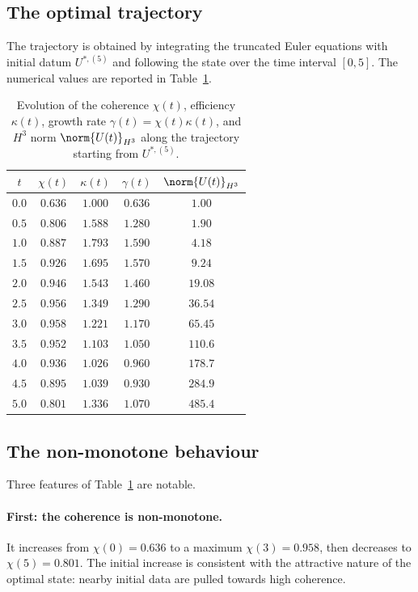 \subsection{The optimal trajectory}
\label{part-5:ssec:optimal-trajectory}

The trajectory is obtained by integrating the truncated Euler 
equations with initial datum $U^{\ast,(5)}$ and following the state 
over the time interval $[0,5]$. The numerical values are reported in 
Table~\ref{part-5:tab:chi-evolution-V}.

\begin{table}[h]
\centering
\caption{Evolution of the coherence $\chi(t)$, efficiency 
$\kappa(t)$, growth rate $\gamma(t) = \chi(t)\kappa(t)$, and $H^3$ norm 
$\norm{U(t)}_{H^3}$ along the trajectory starting from 
$U^{\ast,(5)}$.}
\label{part-5:tab:chi-evolution-V}
\begin{tabular}{ccccc}
\toprule
$t$ & $\chi(t)$ & $\kappa(t)$ & $\gamma(t)$ & $\norm{U(t)}_{H^3}$ \\
\midrule
$0.0$ & $0.636$ & $1.000$ & $0.636$ & $1.00$ \\
$0.5$ & $0.806$ & $1.588$ & $1.280$ & $1.90$ \\
$1.0$ & $0.887$ & $1.793$ & $1.590$ & $4.18$ \\
$1.5$ & $0.926$ & $1.695$ & $1.570$ & $9.24$ \\
$2.0$ & $0.946$ & $1.543$ & $1.460$ & $19.08$ \\
$2.5$ & $0.956$ & $1.349$ & $1.290$ & $36.54$ \\
$3.0$ & $0.958$ & $1.221$ & $1.170$ & $65.45$ \\
$3.5$ & $0.952$ & $1.103$ & $1.050$ & $110.6$ \\
$4.0$ & $0.936$ & $1.026$ & $0.960$ & $178.7$ \\
$4.5$ & $0.895$ & $1.039$ & $0.930$ & $284.9$ \\
$5.0$ & $0.801$ & $1.336$ & $1.070$ & $485.4$ \\
\bottomrule
\end{tabular}
\end{table}

\subsection{The non-monotone behaviour}
\label{part-5:ssec:non-monotone}

Three features of Table~\ref{part-5:tab:chi-evolution-V} are notable.

\paragraph{First: the coherence is non-monotone.} It increases from 
$\chi(0)=0.636$ to a maximum $\chi(3)=0.958$, then decreases to 
$\chi(5)=0.801$. The initial increase is consistent with the 
attractive nature of the optimal state: nearby initial data are 
pulled towards high coherence.

